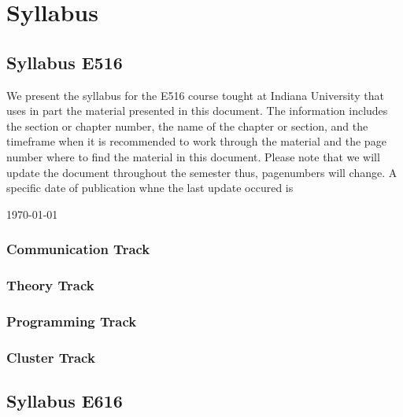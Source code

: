 \part{Syllabus}

\chapter{Syllabus E516}

We present the syllabus for the E516 course tought at Indiana University that 
uses in part the material presented in this document. The information includes the section or chapter number, the name of the chapter or section, and the timeframe  when it is recommended to work through the material and the page number where to find the material in this document. Please note that we will update the document throughout the semester thus, pagenumbers will change. A specific date of publication whne the last update occured is 

\today~\currenttime 


\section{Communication Track}









\section{Theory Track}



\section{Programming Track}

\section{Cluster Track}

\chapter{Syllabus E616}

